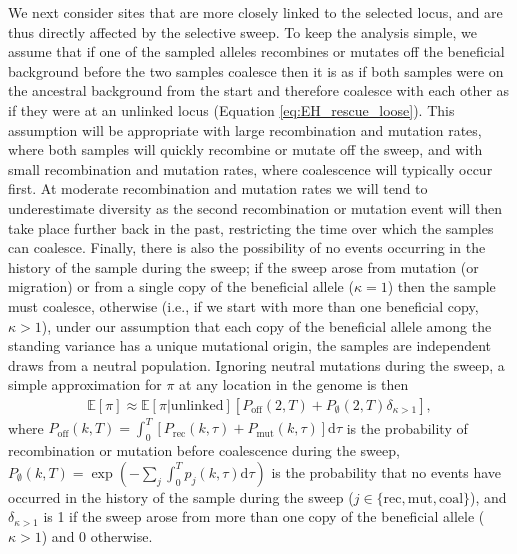 \documentclass[]{article}
\begin{document}
We next consider sites that are more closely linked to the selected locus, and are thus directly affected by the selective sweep.
To keep the analysis simple, we assume that if one of the sampled alleles recombines or mutates off the beneficial background before the two samples coalesce then it is as if both samples were on the ancestral background from the start and therefore coalesce with each other as if they were at an unlinked locus (Equation \ref{eq:EH_rescue_loose}).
This assumption will be appropriate with large recombination and mutation rates, where both samples will quickly recombine or mutate off the sweep, and with small recombination and mutation rates, where coalescence will typically occur first.
At moderate recombination and mutation rates we will tend to underestimate diversity as the second recombination or mutation event will then take place further back in the past, restricting the time over which the samples can coalesce.
Finally, there is also the possibility of no events occurring in the history of the sample during the sweep; if the sweep arose from mutation (or migration) or from a single copy of the beneficial allele ($\kappa=1$) then the sample must coalesce, otherwise (i.e., if we start with more than one beneficial copy, $\kappa>1$), under our assumption that each copy of the beneficial allele among the standing variance has a unique mutational origin, the samples are independent draws from a neutral population.
Ignoring neutral mutations during the sweep, a simple approximation for $\pi$ at any location in the genome is then
\begin{equation}\label{eq:EH_rescue}
\begin{aligned}
\mathbb{E}[\pi ] \approx \mathbb{E}[\pi | \mathrm{unlinked}] \left[ P_\mathrm{off}(2,T) + P_\emptyset(2,T) \delta_{\kappa>1} \right],
\end{aligned}
\end{equation}
where $P_\mathrm{off}(k,T) = \int_0^T [P_\mathrm{rec}(k,\tau) + P_\mathrm{mut}(k,\tau) ] \mathrm{d}\tau$ is the probability of recombination or mutation before coalescence during the sweep, $P_\emptyset(k, T) = \exp \left( -\sum_{j} \int_{0}^T p_{j}(k,\tau) \mathrm{d}\tau \right)$ is the probability that no events have occurred in the history of the sample during the sweep ($j\in\{\mathrm{rec},\mathrm{mut},\mathrm{coal}\}$), and $\delta_{\kappa>1}$ is 1 if the sweep arose from more than one copy of the beneficial allele ($\kappa>1$) and 0 otherwise.
\end{document}
